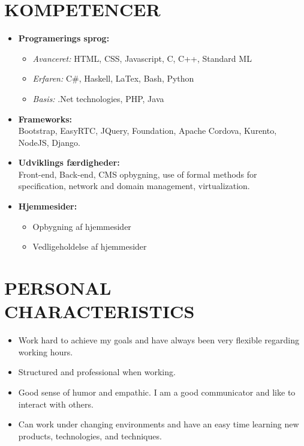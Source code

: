\documentclass[11pt,a4paper,sans]{moderncv}        %
\begin{document}
\section{KOMPETENCER}
\begin{itemize}
\item \textbf{Programerings sprog:}
\begin{itemize}
\item \textit{Avanceret:} HTML, CSS, Javascript, C, C++, Standard ML
\item \textit{Erfaren:} C\#, Haskell, LaTex, Bash, Python
\item \textit{Basis:} .Net technologies, PHP, Java
\end{itemize}
\bigskip

\item \textbf{Frameworks:}\\
Bootstrap, EasyRTC, JQuery, Foundation, Apache Cordova, Kurento, NodeJS, Django.
\bigskip

\item \textbf{Udviklings færdigheder:}\\
Front-end, Back-end, CMS opbygning, use of formal methods for specification, network and domain management, virtualization.
\bigskip

\item \textbf{Hjemmesider:}
\begin{itemize}
\item Opbygning af hjemmesider 
\item Vedligeholdelse af hjemmesider
\end{itemize}
\end{itemize}
\fi

\ifenglish
\section{PERSONAL CHARACTERISTICS}
\begin{itemize}
\item Work hard to achieve my goals and have always been very flexible regarding working hours.
\item Structured and professional when working.
\item Good sense of humor and empathic. I am a good communicator and like to interact with others.
\item Can work under changing environments and have an easy time learning new products, technologies, and techniques.
\end{itemize}
\else
\end{document}
